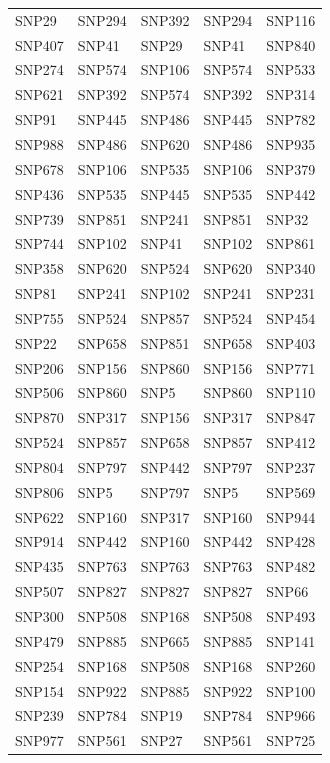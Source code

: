 \begin{table}[ht]
\begin{tabular}{lllll}
  SNP29 & SNP294 & SNP392 & SNP294 & SNP116 \\ 
  SNP407 & SNP41 & SNP29 & SNP41 & SNP840 \\ 
  SNP274 & SNP574 & SNP106 & SNP574 & SNP533 \\ 
  SNP621 & SNP392 & SNP574 & SNP392 & SNP314 \\ 
  SNP91 & SNP445 & SNP486 & SNP445 & SNP782 \\ 
  SNP988 & SNP486 & SNP620 & SNP486 & SNP935 \\ 
  SNP678 & SNP106 & SNP535 & SNP106 & SNP379 \\ 
  SNP436 & SNP535 & SNP445 & SNP535 & SNP442 \\ 
  SNP739 & SNP851 & SNP241 & SNP851 & SNP32 \\ 
  SNP744 & SNP102 & SNP41 & SNP102 & SNP861 \\ 
  SNP358 & SNP620 & SNP524 & SNP620 & SNP340 \\ 
  SNP81 & SNP241 & SNP102 & SNP241 & SNP231 \\ 
  SNP755 & SNP524 & SNP857 & SNP524 & SNP454 \\ 
  SNP22 & SNP658 & SNP851 & SNP658 & SNP403 \\ 
  SNP206 & SNP156 & SNP860 & SNP156 & SNP771 \\ 
  SNP506 & SNP860 & SNP5 & SNP860 & SNP110 \\ 
  SNP870 & SNP317 & SNP156 & SNP317 & SNP847 \\ 
  SNP524 & SNP857 & SNP658 & SNP857 & SNP412 \\ 
  SNP804 & SNP797 & SNP442 & SNP797 & SNP237 \\ 
  SNP806 & SNP5 & SNP797 & SNP5 & SNP569 \\ 
  SNP622 & SNP160 & SNP317 & SNP160 & SNP944 \\ 
  SNP914 & SNP442 & SNP160 & SNP442 & SNP428 \\ 
  SNP435 & SNP763 & SNP763 & SNP763 & SNP482 \\ 
  SNP507 & SNP827 & SNP827 & SNP827 & SNP66 \\ 
  SNP300 & SNP508 & SNP168 & SNP508 & SNP493 \\ 
  SNP479 & SNP885 & SNP665 & SNP885 & SNP141 \\ 
  SNP254 & SNP168 & SNP508 & SNP168 & SNP260 \\ 
  SNP154 & SNP922 & SNP885 & SNP922 & SNP100 \\ 
  SNP239 & SNP784 & SNP19 & SNP784 & SNP966 \\ 
  SNP977 & SNP561 & SNP27 & SNP561 & SNP725 \\ 

\end{tabular}
\end{table}
